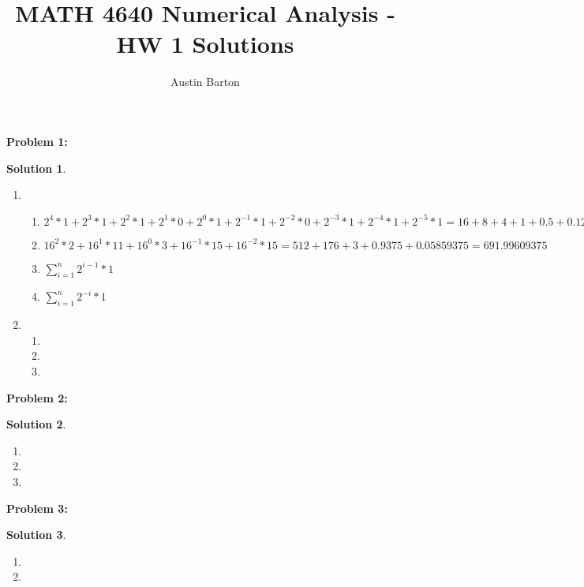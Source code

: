 \documentclass[12pt, letterpaper]{article}
\title{MATH 4640 Numerical Analysis - HW 1 Solutions}
\author{Austin Barton}
\theoremstyle{nonumberplain}
\newtheorem{sol}{Solution}
\begin{document}
\maketitle

\vspace{2em}

\hspace{18pt}\textbf{Problem 1:} \medskip
\begin{sol}
    \begin{enumerate}[label=\roman*.]
        \item
        \begin{enumerate}[label=\alph*)]
            \item $2^4 * 1 + 2^3 * 1 + 2^2 * 1 + 2^1 * 0 + 2^0 * 1 + 2^{-1} * 1 + 2^{-2} * 0 + 2^{-3} * 1 + 2^{-4} * 1 + 2^{-5} * 1 = 16 + 8 + 4 + 1 + 0.5 + 0.125 + 0.0625 +  0.03125 = 29.71875$
            \item $16^2 * 2 + 16^1 * 11 + 16^0 * 3 + 16^{-1} * 15 + 16^{-2} * 15 = 512 + 176 + 3 + 0.9375 + 0.05859375 = 691.99609375$
            \item $\sum_{i = 1}^n 2^{i-1} * 1$
            \item $\sum_{i = 1}^n 2^{-i} * 1$
        \end{enumerate}
        \item
        \begin{enumerate}[label=\alph*)]
            \item
            \item
            \item
        \end{enumerate}
    \end{enumerate}
\end{sol}

\hspace{18pt}\textbf{Problem 2:} \medskip
\begin{sol}
    \begin{enumerate}[label=\alph*)]
        \item
        \item
        \item
    \end{enumerate}
\end{sol}

\hspace{18pt}\textbf{Problem 3:} \medskip
\begin{sol}
    \begin{enumerate}[label=\alph*)]
        \item
        \item
    \end{enumerate}
\end{sol}
\end{document}
